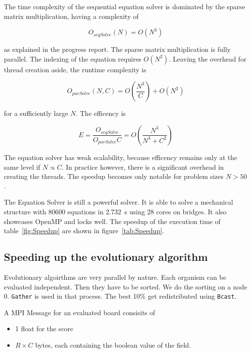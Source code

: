\documentclass[12pt]{article}
\begin{document}
The time complexity of the sequential equation solver is dominated by the sparse matrix multiplication, having a complexity of 

\begin{equation}
    O_\mathit{seqSolve}(N) = O(N^3) 
\end{equation}

as explained in the progress report. The sparse matrix multiplication is fully parallel. The indexing of the equation requires $O(N^2)$. Leaving the overhead for thread creation aside, the runtime complexity is 

\begin{equation}
    O_\mathit{parSolve}(N, C) = O \left(\frac{N^3}{C}\right) + O(N^2)
\end{equation}

for a sufficiently large $N$. The efficency is

\begin{equation}
    E = \frac{O_\mathit{seqSolve}}{O_\mathit{parSolve} C} = O\left(\frac{N^3}{N^3 + C^2}\right)
\end{equation}

The equation solver has weak scalability, because efficency remains only at the same level if $N \propto C$. In practice however, there is a significant overhead in creating the threads. The speedup becomes only notable for problem sizes $N > 50$.

The Equation Solver is still a powerful solver. It is able to solve a mechanical structure with 80600 equations in \SI{2.732}{\second} using 28 cores on bridges. It also showcases OpenMP and locks well. The speedup of the execution time of table~\ref{fig:Speedup} are shown in figure~\ref{tab:Speedup}.

\subsection{Speeding up the evolutionary algorithm}

Evolutionary algoirthms are very parallel by nature. Each organism can be evaluated independent. Then they have to be sorted. We do the sorting on a node 0. \texttt{Gather} is used in that process. The best 10\% get redistributed using \texttt{Bcast}.

A MPI Message for an evaluated board consisits of

\begin{itemize}
    \item 1 float for the score
    \item $R \times C$ bytes, each containing the boolean value of the field.
\end{itemize}
\end{document}
